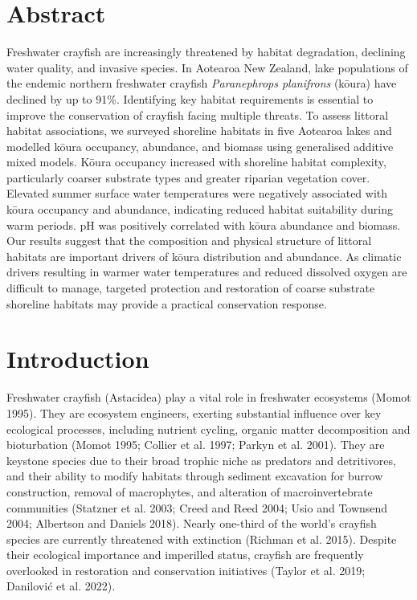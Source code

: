 \documentclass[
  12pt,
  a4paper,
  oneside]{scrbook}
\begin{document}
\section*{Abstract}\label{abstract-2}

Freshwater crayfish are increasingly threatened by habitat degradation,
declining water quality, and invasive species. In Aotearoa New Zealand,
lake populations of the endemic northern freshwater crayfish
\emph{Paranephrops planifrons} (kōura) have declined by up to 91\%.
Identifying key habitat requirements is essential to improve the
conservation of crayfish facing multiple threats. To assess littoral
habitat associations, we surveyed shoreline habitats in five Aotearoa
lakes and modelled kōura occupancy, abundance, and biomass using
generalised additive mixed models. Kōura occupancy increased with
shoreline habitat complexity, particularly coarser substrate types and
greater riparian vegetation cover. Elevated summer surface water
temperatures were negatively associated with kōura occupancy and
abundance, indicating reduced habitat suitability during warm periods.
pH was positively correlated with kōura abundance and biomass. Our
results suggest that the composition and physical structure of littoral
habitats are important drivers of kōura distribution and abundance. As
climatic drivers resulting in warmer water temperatures and reduced
dissolved oxygen are difficult to manage, targeted protection and
restoration of coarse substrate shoreline habitats may provide a
practical conservation response.

\section{Introduction}\label{introduction-1}

Freshwater crayfish (Astacidea) play a vital role in freshwater
ecosystems (Momot 1995). They are ecosystem engineers, exerting
substantial influence over key ecological processes, including nutrient
cycling, organic matter decomposition and bioturbation (Momot 1995;
Collier et al. 1997; Parkyn et al. 2001). They are keystone species due
to their broad trophic niche as predators and detritivores, and their
ability to modify habitats through sediment excavation for burrow
construction, removal of macrophytes, and alteration of
macroinvertebrate communities (Statzner et al. 2003; Creed and Reed
2004; Usio and Townsend 2004; Albertson and Daniels 2018). Nearly
one-third of the world's crayfish species are currently threatened with
extinction (Richman et al. 2015). Despite their ecological importance
and imperilled status, crayfish are frequently overlooked in restoration
and conservation initiatives (Taylor et al. 2019; Danilović et al.
2022).
\end{document}
